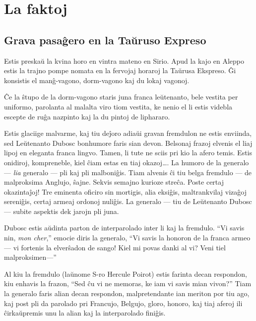 \part{La faktoj}
\renewcommand*{\theHchapter}{chX.\the\value{chapter}}
\setcounter{chapter}{0}


\chapter[Grava pasaĝero en la Taŭruso Expreso]{Grava pasaĝero en la Taŭruso Expreso}


Estis preskaŭ la kvina horo en vintra mateno en Sirio. Apud la kajo en Aleppo estis la trajno pompe nomata en la fervojaj horaroj la Taŭrusa Ekspreso. Ĝi konsistis el manĝ-vagono, dorm-vagono kaj du lokaj vagonoj.

\sectionbreak

Ĉe la ŝtupo de la dorm-vagono staris juna franca leŭtenanto, bele vestita per uniformo, parolanta al malalta viro tiom vestita, ke nenio el li estis videbla escepte de ruĝa nazpinto kaj la du pintoj de liphararo.

Estis glaciige malvarme, kaj tiu deĵoro adiaŭi gravan fremdulon ne estis enviinda, sed Leŭtenanto Dubosc bonhumore faris sian devon. Belsonaj frazoj elvenis el liaj lipoj en eleganta franca lingvo. Tamen, li tute ne sciis pri kio la afero temis. Estis onidiroj, kompreneble, kiel ĉiam estas en tiaj okazoj{\ldots}. La humoro de la generalo --- \emph{lia} generalo --- pli kaj pli malboniĝis. Tiam alvenis ĉi tiu belga fremdulo --- de malproksima Anglujo, ŝajne. Sekvis semajno kurioze streĉa. Poste certaj okazintaĵoj! Tre eminenta oficiro sin mortigis, alia eksiĝis, maltrankvilaj vizaĝoj sereniĝis, certaj armeaj ordonoj nuliĝis. La generalo --- tiu de Leŭtenanto Dubosc --- subite aspektis dek jarojn pli juna.

Dubosc estis aŭdinta parton de interparolado inter li kaj la fremdulo. ``Vi savis nin, \emph{mon cher},'' emocie diris la generalo, ``Vi savis la honoron de la franca armeo --- vi fortenis la elverŝadon de sango! Kiel mi povas danki al vi? Veni tiel malproksimen---''

Al kiu la fremdulo (laŭnome S-ro Hercule Poirot) estis farinta decan respondon, kiu enhavis la frazon, ``Sed ĉu vi ne memoras, ke iam vi savis mian vivon?'' Tiam la generalo faris alian decan respondon, malpretendante ian meriton por tiu ago, kaj post pli da parolado pri Francujo, Belgujo, gloro, honoro, kaj tiaj aferoj ili ĉirkaŭpremis unu la alian kaj la interparolado finiĝis.

